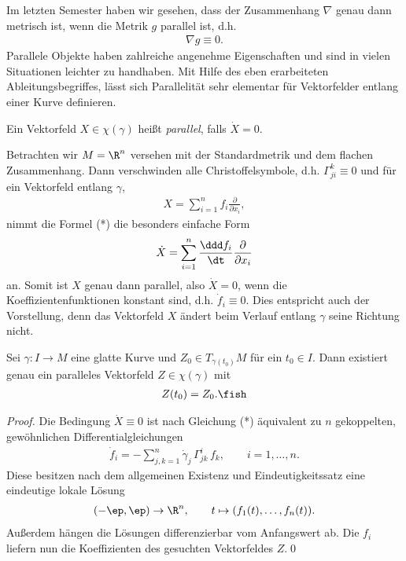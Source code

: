 \documentclass[%
	paper=a5,%
	fleqn,%
	DIV=18,%
	BCOR=0mm,
	fontsize=11pt,
	titlepage=false,%
	bibliography=totoc,
	DIV=18,%
	twoside=true,
	pdftitle=Riemannsche Geometrie,
	pdfauthor=Uwe Semmelmann,
	numbers=noendperiod]%
	{scrbook}
\begin{document}
Im letzten Semester haben wir gesehen, dass der Zusammenhang $\nabla$ genau dann
metrisch ist, wenn die Metrik $g$ parallel ist, d.h.
\begin{align*}
\nabla g \equiv 0.
\end{align*}
Parallele Objekte haben zahlreiche angenehme Eigenschaften und sind in vielen
Situationen leichter zu handhaben. Mit Hilfe des eben erarbeiteten
Ableitungsbegriffes, lässt sich Parallelität sehr elementar für Vektorfelder
entlang einer Kurve definieren.

\begin{defn}
Ein Vektorfeld $X\in\chi(\gamma)$ heißt \emph{parallel}, falls $\dot{X} =
0$.\fish
\end{defn}

\begin{ex}
Betrachten wir $M=\R^n$ versehen mit der Standardmetrik und dem flachen
Zusammenhang. Dann verschwinden alle Christoffelsymbole, d.h. $\Gamma_{ji}^k
\equiv 0$ und für ein Vektorfeld entlang $\gamma$,
\begin{align*}
X = \sum_{i=1}^n f_i \frac{\partial}{\partial x_i},
\end{align*}
nimmt die Formel (*) die besonders einfache Form
\begin{align*}
\dot{X} = \sum_{i=1}^n \frac{\ddd f_i}{\dt} \frac{\partial}{\partial x_i}
\end{align*}
an. Somit ist $X$ genau dann parallel, also $\dot{X}  =0$, wenn die
Koeffizientenfunktionen konstant sind, d.h. $\dot{f}_i \equiv 0$. Dies
entspricht auch der Vorstellung, denn das Vektorfeld $X$ ändert beim Verlauf
entlang $\gamma$ seine Richtung nicht.\boxc
\end{ex}

\begin{lem}
Sei $\gamma\colon I\to M$ eine glatte Kurve und $Z_0\in T_{\gamma(t_0)}M$ für ein
$t_0\in I$. Dann existiert genau ein paralleles Vektorfeld $Z\in\chi(\gamma)$
mit
\begin{align*}
Z(t_0) = Z_0.\fish 
\end{align*}
\end{lem}
\begin{proof}
Die Bedingung $\dot{X}\equiv 0$ ist nach Gleichung (*) äquivalent zu $n$
gekoppelten, gewöhnlichen Differentialgleichungen
\begin{align*}
\dot{f}_i = - \sum_{j,k=1}^n \dot{\gamma}_j\, \Gamma_{jk}^i\, f_k ,\qquad i =
1,\ldots,n.
\end{align*}
Diese besitzen nach dem allgemeinen Existenz und Eindeutigkeitssatz eine
eindeutige lokale Lösung
\begin{align*}
(-\ep,\ep)\to \R^n,\qquad t\mapsto (f_1(t),\ldots,f_n(t)).
\end{align*}
Außerdem hängen die Lösungen differenzierbar vom Anfangswert ab. Die $f_i$
liefern nun die Koeffizienten des gesuchten Vektorfeldes $Z$.\qed
\end{proof}
\end{document}
